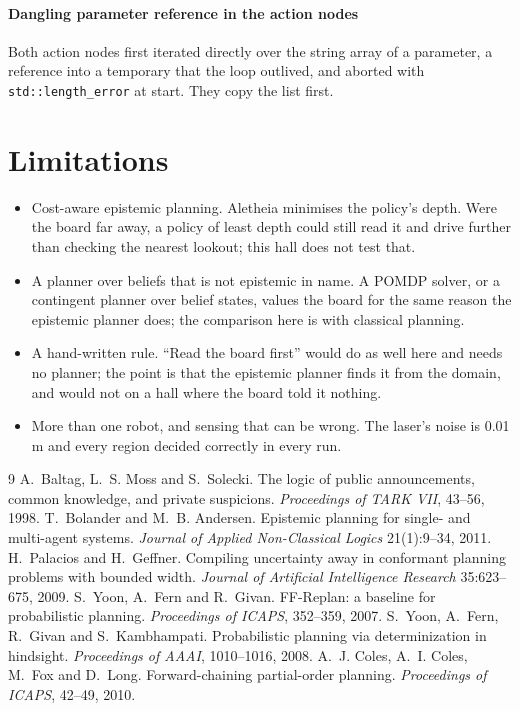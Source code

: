 \documentclass[11pt,a4paper]{article}
\theoremstyle{definition}
\newcommand{\code}[1]{\texttt{\small #1}}
\begin{document}
\paragraph{Dangling parameter reference in the action nodes}
Both action nodes first iterated directly over the string array of a
parameter, a reference into a temporary that the loop outlived, and aborted with
\code{std::length\_error} at start. They copy the list first.

\section{Limitations}

\begin{itemize}[leftmargin=1.4em]
\item Cost-aware epistemic planning. Aletheia minimises the policy's depth.
Were the board far away, a policy of least depth could still read it and drive
further than checking the nearest lookout; this hall does not test that.
\item A planner over beliefs that is not epistemic in name. A POMDP solver, or
a contingent planner over belief states, values the board for the same reason
the epistemic planner does; the comparison here is with classical planning.
\item A hand-written rule. ``Read the board first'' would do as well here and
needs no planner; the point is that the epistemic planner finds it from the
domain, and would not on a hall where the board told it nothing.
\item More than one robot, and sensing that can be wrong. The laser's noise is
0.01\,m and every region decided correctly in every run.
\end{itemize}

\begin{thebibliography}{9}
 A.~Baltag, L.~S. Moss and S.~Solecki.
The logic of public announcements, common knowledge, and private suspicions.
\emph{Proceedings of TARK VII}, 43--56, 1998.
 T.~Bolander and M.~B. Andersen.
Epistemic planning for single- and multi-agent systems.
\emph{Journal of Applied Non-Classical Logics} 21(1):9--34, 2011.
 H.~Palacios and H.~Geffner.
Compiling uncertainty away in conformant planning problems with bounded width.
\emph{Journal of Artificial Intelligence Research} 35:623--675, 2009.
 S.~Yoon, A.~Fern and R.~Givan.
FF-Replan: a baseline for probabilistic planning.
\emph{Proceedings of ICAPS}, 352--359, 2007.
 S.~Yoon, A.~Fern, R.~Givan and S.~Kambhampati.
Probabilistic planning via determinization in hindsight.
\emph{Proceedings of AAAI}, 1010--1016, 2008.
 A.~J. Coles, A.~I. Coles, M.~Fox and D.~Long.
Forward-chaining partial-order planning.
\emph{Proceedings of ICAPS}, 42--49, 2010.
\end{thebibliography}
\end{document}
